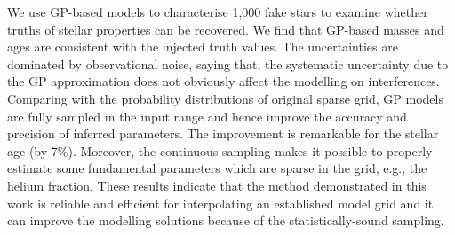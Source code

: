 We use GP-based models to characterise 1,000 fake stars to examine whether truths of stellar properties can be recovered. We find that GP-based masses and ages are consistent with the injected truth values. The uncertainties are dominated by observational noise, saying that, the systematic uncertainty due to the GP approximation does not obviously affect the modelling on interferences. Comparing with the probability distributions of original sparse grid, GP models are fully sampled in the input range and hence improve the accuracy and precision of inferred parameters. The improvement is remarkable for the stellar age (by 7\%). Moreover, the continuous sampling makes it possible to properly estimate some fundamental parameters which are sparse in the grid, e.g., the helium fraction. These results indicate that the method demonstrated in this work is reliable and efficient for interpolating an established model grid and it can improve the modelling solutions because of the statistically-sound sampling. 